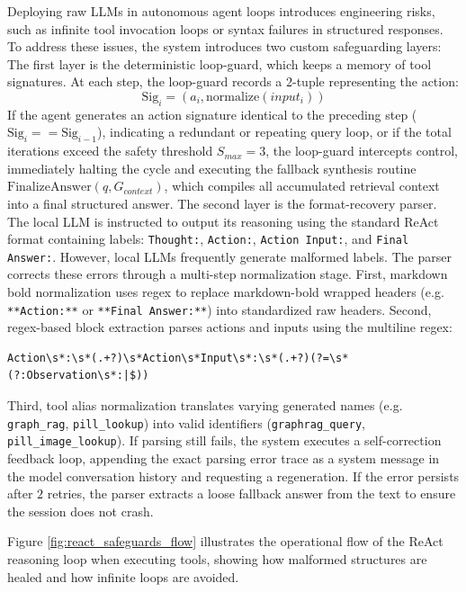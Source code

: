 \documentclass[../main.tex]{subfiles}
\begin{document}
Deploying raw LLMs in autonomous agent loops introduces engineering risks, such as infinite tool invocation loops or syntax failures in structured responses. To address these issues, the system introduces two custom safeguarding layers:
The first layer is the deterministic loop-guard, which keeps a memory of tool signatures. At each step, the loop-guard records a 2-tuple representing the action:
\begin{equation}\label{eq:tool_signature}
\text{Sig}_i = (a_i, \text{normalize}(input_i))
\end{equation}
If the agent generates an action signature identical to the preceding step ($\text{Sig}_i == \text{Sig}_{i-1}$), indicating a redundant or repeating query loop, or if the total iterations exceed the safety threshold $S_{max} = 3$, the loop-guard intercepts control, immediately halting the cycle and executing the fallback synthesis routine $\text{FinalizeAnswer}(q, G_{context})$, which compiles all accumulated retrieval context into a final structured answer. The second layer is the format-recovery parser. The local LLM is instructed to output its reasoning using the standard ReAct format containing labels: \texttt{Thought:}, \texttt{Action:}, \texttt{Action Input:}, and \texttt{Final Answer:}. However, local LLMs frequently generate malformed labels. The parser corrects these errors through a multi-step normalization stage. First, markdown bold normalization uses regex to replace markdown-bold wrapped headers (e.g. \texttt{**Action:**} or \texttt{**Final Answer:**}) into standardized raw headers. Second, regex-based block extraction parses actions and inputs using the multiline regex:
\begin{lstlisting}[basicstyle=\footnotesize\ttfamily,breaklines=true,columns=fullflexible]
Action\s*:\s*(.+?)\s*Action\s*Input\s*:\s*(.+?)(?=\s*(?:Observation\s*:|$))
\end{lstlisting}
Third, tool alias normalization translates varying generated names (e.g. \texttt{graph\_rag}, \texttt{pill\_lookup}) into valid identifiers (\texttt{graphrag\_query}, \texttt{pill\_image\_lookup}). If parsing still fails, the system executes a self-correction feedback loop, appending the exact parsing error trace as a system message in the model conversation history and requesting a regeneration. If the error persists after $2$ retries, the parser extracts a loose fallback answer from the text to ensure the session does not crash.

Figure \ref{fig:react_safeguards_flow} illustrates the operational flow of the ReAct reasoning loop when executing tools, showing how malformed structures are healed and how infinite loops are avoided.
\end{document}

